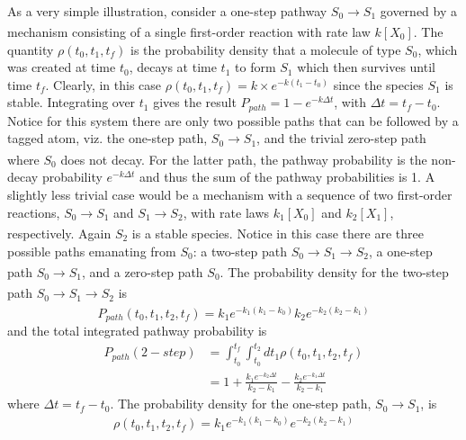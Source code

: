 \paragraph{}
As a very simple illustration, consider a one-step pathway $S_0 \xrightarrow []{}S_1$ governed by a
mechanism consisting of a single first-order reaction with rate law $k\left[X_0\right]$. The quantity
$\rho(t_0, t_1, t_f)$ is the probability density that a molecule of type $S_0$, which was created at
time $t_0$, decays at time $t_1$ to form $S_1$ which then survives until time $t_f$. Clearly, in this
case $\rho(t_0, t_1, t_f) = k \times e^{-k(t_1 - t_0)}$ since the species $S_1$ is stable. Integrating over $t_1$
gives the result $P_{path} = 1 - e^{-k \Delta t}$, with $\Delta t = t_f - t_0$. Notice for this system there
are only two possible paths that can be followed by a tagged atom, viz. the one-step
path, $S_0 \xrightarrow[]{} S_1$, and the trivial zero-step path where $S_0$ does not decay. For the latter path, the pathway probability is the non-decay probability $e^{-k \Delta t}$ and thus the sum
of the pathway probabilities is 1. A slightly less trivial case would be a mechanism
with a sequence of two first-order reactions, $S_0 \xrightarrow[]{} S_1$ and $S_1 \xrightarrow[]{} S_2$, with rate laws
$k_1[X_0]$ and $k_2[X_1]$, respectively. Again $S_2$ is a stable species. Notice in this case there
are three possible paths emanating from $S_0$: a two-step path $S_0 \xrightarrow[]{} S_1 \xrightarrow[]{} S_2$, a one-step
path $S_0 \xrightarrow[]{} S_1$, and a zero-step path $S_0$. The probability density for the two-step path
$S_0 \xrightarrow[]{} S_1 \xrightarrow[]{} S_2$ is
\begin{equation}
\label{ch2:eqn5}
P_{path}(t_0,t_1,t_2,t_f) = k_1 e^{-k_1(k_1-k_0)} k_2e^{-k_2(k_2-k_1)} 
\end{equation}
and the total integrated pathway probability is
\begin{equation}
\label{ch2:eqn6}
\begin{split}
P_{path}(2-step) &= \int_{t_0}^{t_f}{\int_{t_0}^{t_2}{dt_1 \rho(t_0, t_1, t_2, t_f) }} \\
&= 1 + \frac{k_1 e^{- k_2 \Delta t}}{k_2 - k_1} - \frac{k_2 e^{- k_1 \Delta t}}{k_2 - k_1} 
\end{split}
\end{equation}
where $\Delta t = t_f - t_0$. The probability density for the one-step path, $S_0 \xrightarrow []{} S_1$, is
\begin{equation}
\label{ch2:eqn7}
\rho(t_0,t_1,t_2,t_f) = k_1 e^{-k_1(k_1-k_0)} e^{-k_2(k_2-k_1)} 
\end{equation}
